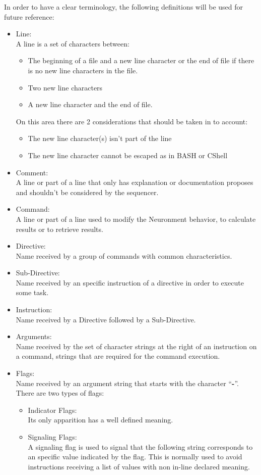 In order to have a clear terminology, the following definitions will be used for future reference:
\begin{itemize}
  \item Line:\\
  A line is a set of characters between:
  \begin{itemize}
    \item The beginning of a file and a new line character or the end of file if there is no new line characters in the file.
    \item Two new line characters
    \item A new line character and the end of file.
  \end{itemize}
  On this area there are 2 considerations that should be taken in to account:
  \begin{itemize}
    \item The new line character(s) isn't part of the line
    \item The new line character cannot be escaped as in BASH or CShell
  \end{itemize}
  \item Comment:\\
  A line or part of a line that only has explanation or documentation proposes and shouldn't be considered by the sequencer.
  \item Command:\\
  A line or part of a line used to modify the Neuronment behavior, to calculate results or to retrieve results.
  \item Directive:\\
  Name received by a group of commands with common characteristics.
  \item Sub-Directive:\\
  Name received by an specific instruction of a directive in order to execute some task.
  \item Instruction:\\
  Name received by a Directive followed by a Sub-Directive.
  \item Arguments:\\
  Name received by the set of character strings at the right of an instruction on a command, strings that are required for the command execution.
  \item Flags:\\
  Name received by an argument string that starts with the character ``\textbf{-}''. There are two types of flags:
  \begin{itemize}
    \item Indicator Flags:\\
    Its only apparition has a well defined meaning.
    \item Signaling Flags:\\
    A signaling flag is used to signal that the following string corresponds to an specific value indicated by the flag. This is normally used to avoid instructions receiving a list of values with non in-line declared meaning.
  \end{itemize}
\end{itemize}

